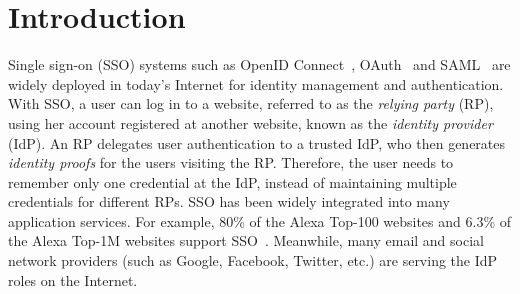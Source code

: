 \section{Introduction}
\label{sec:intro}

Single sign-on (SSO) systems such as OpenID Connect~\cite{OpenIDConnect}, OAuth~\cite{rfc6749} and SAML~\cite{SAML} are widely deployed in today's Internet for identity management and authentication. With SSO, a user can log in to a website, referred to as the \emph{relying party} (RP), using her account registered at another website, known as the \emph{identity provider} (IdP). An RP delegates user authentication to a trusted IdP, who then generates \emph{identity proofs} for the users visiting the RP. Therefore, the user needs to remember only one credential at the IdP, instead of maintaining multiple credentials for different RPs.
SSO has been widely integrated into many application services.
For example, 80\% of the Alexa Top-100 websites and 6.3\% of the Alexa Top-1M websites support SSO~\cite{GhasemisharifRC18}.
Meanwhile, many email and social network providers (such as Google, Facebook, Twitter, etc.) are serving the IdP roles on the Internet. %


